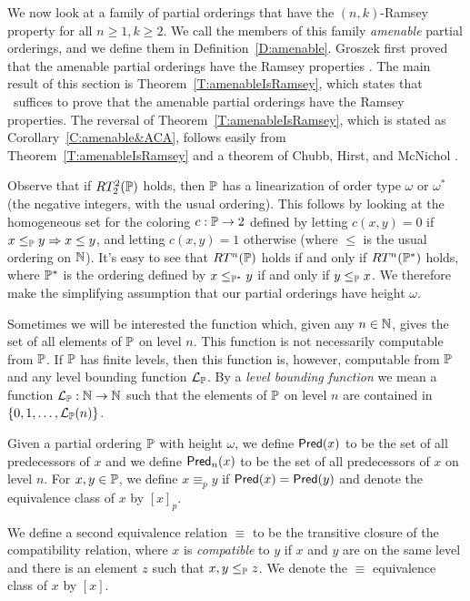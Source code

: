 We now look at a family of partial orderings that have the $(n,k)$-Ramsey property
for all $n\geq 1,k\geq 2$.
We call the members of this family \textit{amenable} partial orderings,
and we define them in Definition~\ref{D:amenable}.
Groszek first proved that the amenable partial orderings
have the Ramsey properties \cite{GroszekAmenable}.
The main result of this section is Theorem~\ref{T:amenableIsRamsey},
which states that \ACAo\ suffices to prove that
the amenable partial orderings have the Ramsey properties.
The reversal of Theorem~\ref{T:amenableIsRamsey}, which is
stated as Corollary~\ref{C:amenable&ACA}, follows easily
from Theorem~\ref{T:amenableIsRamsey} and a theorem
of Chubb, Hirst, and McNichol \cite{CHM}.

Observe that if $RT^2_2(\mathbb{P})$ holds, then $\mathbb{P}$ has a linearization of order type
$\omega$ or $\omega^*$ (the negative integers, with the usual ordering).
This follows by looking at the homogeneous set for the coloring $c:\mathbb{P}\to 2$ defined by letting
$c(x,y)=0$ if $x\leq_{\mathbb{P}}y \Rightarrow  x\leq y$, and letting $c(x,y)=1$ otherwise
(where $\leq$ is the usual ordering on $\mathbb{N}$).
It's easy to see that $RT^n(\mathbb{P})$ holds if and only if $RT^n(\mathbb{P}^*)$ holds,
where $\mathbb{P}^*$ is the ordering defined by $x\leq_{\mathbb{P}^*} y$ if and only if $y\leq_{\mathbb{P}} x$.
We therefore make the simplifying assumption that our partial orderings have height $\omega$.

Sometimes we will be interested the function which, given any $n\in\mathbb{N}$,
gives the set of all elements of $\mathbb{P}$ on level $n$.
This function is not necessarily computable from $\mathbb{P}$.
If $\mathbb{P}$ has finite levels, then this function is, however,
computable from $\mathbb{P}$ and any level bounding function $\mathcal{L}_{\mathbb{P}}$.
By a \textit{level bounding function} we mean a
function $\mathcal{L}_{\mathbb{P}}:\mathbb{N}\to\mathbb{N}$ such that
the elements of $\mathbb{P}$ on level $n$ are contained in $\{0,1,\ldots,\mathcal{L}_{\mathbb{P}}(n)\}$.

Given a partial ordering $\mathbb{P}$ with height $\omega$,
we define $\mathsf{Pred}(x)$  to be the set of all predecessors of $x$ and we define
$\mathsf{Pred}_n(x)$  to be the set of all predecessors of $x$ on level $n$.
For $x,y\in\mathbb{P}$, we define $x\equiv_p y$  if $\mathsf{Pred}(x)=\mathsf{Pred}(y)$
and denote the equivalence class of $x$ by $[x]_p$.

We define a second equivalence relation $\equiv$ \index{$\equiv $} to be the transitive closure
of the compatibility relation, where $x$ is \textit{compatible} to $y$
if $x$ and $y$ are on the same level and there is an
element $z$ such that $x,y\leq_{\mathbb{P}} z$.
We denote the $\equiv$ equivalence class of $x$ by $[x]$.

